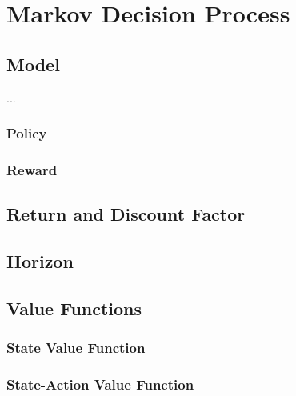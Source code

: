 \section{Markov Decision Process}
\label{sec:mdp}

\subsection{Model}
...

\subsubsection{Policy}

\subsubsection{Reward}

\subsection{Return and Discount Factor}

\subsection{Horizon}

\subsection{Value Functions}

\subsubsection{State Value Function}

\subsubsection{State-Action Value Function}
